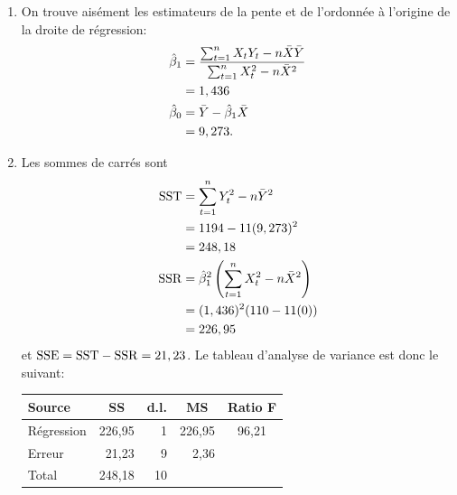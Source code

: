\begin{solution}{2.13}
    \begin{enumerate}
    \item On trouve aisément les estimateurs de la pente et de
      l'ordonnée à l'origine de la droite de régression:
      \begin{align*}
        \hat{\beta}_1
        &= \frac{\sum_{t=1}^n X_t Y_t - n \bar{X}\bar{Y}}{%
          \sum_{t=1}^n X_t^2 - n \bar{X}^2} \\
        &= 1,436 \\
        \hat{\beta}_0
        &= \bar{Y} - \hat{\beta}_1 \bar{X} \\
        &= 9,273.
      \end{align*}
    \item Les sommes de carrés sont
      \begin{align*}
        \mathrm{SST}
        &= \sum_{t=1}^n Y_t^2 - n \bar{Y}^2 \\
        &= 1194 - 11 (9,273)^2 \\
        &= 248,18 \\
        \mathrm{SSR}
        &= \hat{\beta}_1^2
        \left(
          \sum_{t=1}^n X_t^2 - n \bar{X}^2
        \right) \\
        &= (1,436)^2 (110 - 11 (0)) \\
        &= 226,95
      \end{align*}
      et $\mathrm{SSE} = \mathrm{SST} - \mathrm{SSR} = 21,23$. Le tableau d'analyse de
      variance est donc le suivant:

      \begin{center}
        \begin{tabular}{lrrrc}
          \toprule
          Source
          & \multicolumn{1}{c}{SS}
          & \multicolumn{1}{c}{d.l.}
          & \multicolumn{1}{c}{MS}
          & Ratio F \\
          \midrule
          Régression & 226,95 &   1  & 226,95 & 96,21 \\
          Erreur     &  21,23 &   9  &   2,36 &  \\
          \midrule
          Total      & 248,18 &  10  &        & \\
          \bottomrule
        \end{tabular}
      \end{center}


\end{enumerate}
\end{solution}
